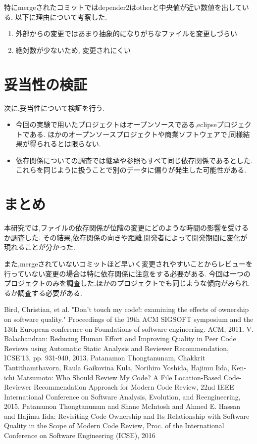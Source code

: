 \documentclass[submit,ses,noauthor]{ipsj} %
\begin{document}
特にmergeされたコミットではdepender2はotherと中央値が近い数値を出している.
以下に理由について考察した.

\begin{enumerate}
\item 外部からの変更ではあまり抽象的になりがちなファイルを変更しづらい
\item 絶対数が少ないため, 変更されにくい
\end{enumerate}

\section{妥当性の検証}\label{妥当性の検証}
次に,妥当性について検証を行う.

\begin{itemize}
\item 今回の実験で用いたプロジェクトはオープンソースである,eclipseプロジェクトである.
ほかのオープンソースプロジェクトや商業ソフトウェアで,同様結果が得られるとは限らない.

\item 依存関係についての調査では継承や参照もすべて同じ依存関係であるとした.
これらを同じように扱うことで別のデータに偏りが発生した可能性がある.
\end{itemize}


\section{まとめ} \label{まとめ}
本研究では,ファイルの依存関係が位階の変更にどのような時間の影響を受けるか調査した.
その結果,依存関係の向きや距離,開発者によって開発期間に変化が現れることが分かった.

また,mergeされていないコミットほど早いく変更されやすいことからレビューを行っていない変更の場合は特に依存関係に注意をする必要がある.
今回は一つのプロジェクトのみを調査した.ほかのプロジェクトでも同じような傾向がみられるか調査する必要がある.



\begin{thebibliography}{10}
Bird, Christian, et al. "Don't touch my code!: examining the effects of ownership on software quality." Proceedings of the 19th ACM SIGSOFT symposium and the 13th European conference on Foundations of software engineering. ACM, 2011.
V. Balachandran: Reducing Human Effort and Improving Quality in Peer Code Reviews using Automatic Static Analysis and Reviewer Recommendation, ICSE'13, pp. 931-940, 2013.
Patanamon Thongtanunam, Chakkrit Tantithamthavorn, Raula Gaikovina Kula, Norihiro Yoshida, Hajimu Iida, Ken-ichi Matsumoto: Who Should Review My Code? A File Location-Based Code-Reviewer Recommendation Approach for Modern Code Review, 22nd IEEE International Conference on Software Analysis, Evolution, and Reengineering, 2015.
Patanamon Thongtanunam and Shane McIntosh and Ahmed E. Hassan and Hajimu Iida: Revisiting Code Ownership and Its Relationship with Software Quality in the Scope of Modern Code Review, Proc. of the International Conference on Software Engineering (ICSE), 2016
 \end{thebibliography}
\end{document}
